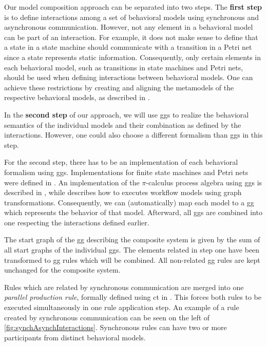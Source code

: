 \documentclass[a4paper]{easychair}
\begin{document}
Our model composition approach can be separated into two steps.
The \textbf{first step} is to define interactions among a set of behavioral models using synchronous and asynchronous communication.
However, not any element in a behavioral model can be part of an interaction.
For example, it does not make sense to define that a state in a state machine should communicate with a transition in a Petri net since a state represents static information.
Consequently, only certain elements in each behavioral model, such as transitions in state machines and Petri nets, should be used when defining interactions between behavioral models.
One can achieve these restrictions by creating and aligning the metamodels of the respective behavioral models, as described in \cite{krauterBehavioralConsistencyHeterogeneous2021}.

In the \textbf{second step} of our approach, we will use \glspl*{gg} to realize the behavioral semantics of the individual models and their combination as defined by the interactions.
However, one could also choose a different formalism than \glspl*{gg} in this step.

For the second step, there has to be an implementation of each behavioral formalism using \glspl*{gg}.
Implementations for finite state machines and Petri nets were defined in \cite{krauterBehavioralConsistencyHeterogeneous2021}.
An implementation of the $\pi$-calculus process algebra using \glspl*{gg} is described in \cite{gadducciGraphRewritingPcalculus2007}, while \cite{rutleMetamodellingApproachBehavioural2012} describes how to executes workflow models using graph transformations.
Consequently, we can (automatically) map each model to a \gls*{gg} which represents the behavior of that model.
Afterward, all \glspl*{gg} are combined into one respecting the interactions defined earlier.

The start graph of the \gls*{gg} describing the composite system is given by the sum of all start graphs of the individual \glspl*{gg}.
The elements related in step one have been transformed to \gls*{gg} rules which will be combined.
All non-related \gls*{gg} rules are kept unchanged for the composite system.

Rules which are related by synchronous communication are merged into one \textit{parallel production rule}, formally defined using \gls*{ct} in \cite[Def. 3.2.7]{baldanConcurrentSemanticsAlgebraic1999}.
This forces both rules to be executed simultaneously in one rule application step. 
An example of a rule created by synchronous communication can be seen on the left of \autoref{fig:synchAsynchInteractions}.
Synchronous rules can have two or more participants from distinct behavioral models.  
\end{document}
